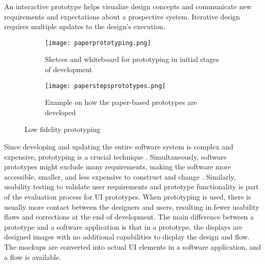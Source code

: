 An interactive prototype helps visualize design concepts and communicate new requirements and expectations about a prospective system.
Iterative design requires multiple updates to the design's execution.
\begin{figure}[htbp!]
  \centering
  \begin{subfigure}[b]{0.6\textwidth}
    \texttt{[image: paperprototyping.png]}
    \caption{Sketces and whiteboard for prototyping in initial stages of development}
    \label{fig:background:paperPrototyping}   
  \end{subfigure}             
  \begin{subfigure}[b]{0.5\textwidth}
    \texttt{[image: paperstepsprototypes.png]}
    \caption[Paper based prototypes]{Example on how the paper-based prototypes are developed  \cite{misc:prototyping:uxpin}}
    \label{fig:background:paperprototypes}
  \end{subfigure}             
  \caption[Low fidelity prototyping]{Low fidelity prototyping}
  \label{fig:background:main}
\end{figure}
Since developing and updating the entire software system is complex and expensive, prototyping is a crucial technique \cite{article:prototyping:szekely}.
Simultaneously, software prototypes might exclude many requirements, making the software more accessible, smaller, and less expensive to construct and change \cite{article:prototyping:szekely}. 
Similarly, usability testing to validate user requirements and prototype functionality is part of the evaluation process for UI prototypes.
When prototyping is used, there is usually more contact between the designers and users, resulting in fewer usability flaws and corrections at the end of development.
The main difference between a prototype and a software application is that in a prototype, the displays are designed images with no additional capabilities to display the design and flow. The mockups are converted into actual UI elements in a software application, and a flow is available.


